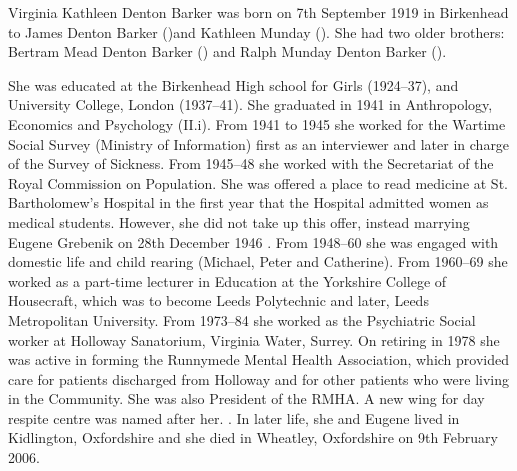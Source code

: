 
Virginia Kathleen Denton Barker was born on 7th September 1919 \cite{VKDBarkerManuscript} in Birkenhead to James Denton Barker ()and Kathleen Munday ().  She had two older brothers:  Bertram Mead Denton Barker () and Ralph Munday Denton Barker (). 

She was educated at the Birkenhead High school for Girls (1924--37), and University College, London (1937--41). She graduated in 1941 in Anthropology, Economics and Psychology (II.i). From 1941 to 1945 she worked for the Wartime Social Survey (Ministry of Information) first as an interviewer and later in charge of the Survey of Sickness. From 1945--48 she worked with the Secretariat of the Royal Commission on Population. She was offered a place to read medicine at St. Bartholomew's Hospital in the first year that the Hospital admitted women as medical students. However, she did not take up this offer, instead marrying Eugene Grebenik on 28th December 1946 \cite{VKDBarkerManuscript}. From 1948--60 she was engaged with domestic life and child rearing  (Michael, Peter and Catherine). From 1960--69 she worked as a part-time lecturer in Education at the Yorkshire College of Housecraft, which was to become Leeds Polytechnic and later, Leeds Metropolitan University. From 1973--84 she worked as the Psychiatric Social worker at Holloway Sanatorium, Virginia Water, Surrey. On retiring in 1978 she was active in forming the Runnymede Mental Health Association, which provided care for patients discharged from Holloway and for other patients who were living in the Community. She was also President of the RMHA. A new wing for day respite centre was named after her. \cite{VirginiaDocs}.
In later life, she and Eugene lived in Kidlington, Oxfordshire and she died in Wheatley, Oxfordshire  on 9th February 2006.
